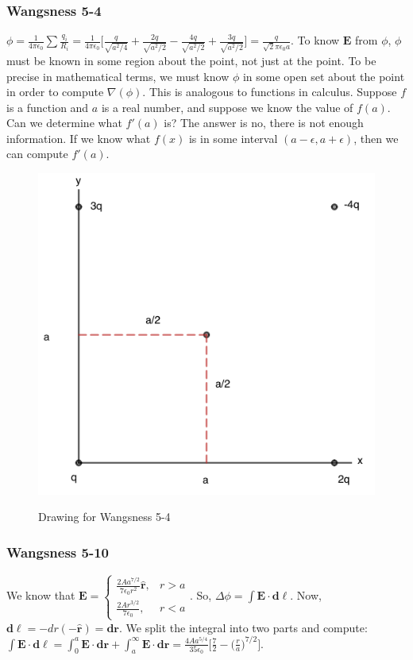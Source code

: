 \documentclass{article}
\theoremstyle{mystyle}
\begin{document}
\subsubsection{Wangsness 5-4}
$\phi = \frac{1}{4\pi \epsilon_0} \sum \frac{q_i}{R_i} = \frac{1}{4\pi \epsilon_0}\bigg[ \frac{q}{\sqrt{a^2/4}}+\frac{2q}{\sqrt{a^2/2}}-\frac{4q}{\sqrt{a^2/2}}+\frac{3q}{\sqrt{a^2/2}}\bigg] = \frac{q}{\sqrt{2}\pi \epsilon_0 a}$. To know $\mathbf{E}$ from $\phi$, $\phi$ must be known in some region about the point, not just at the point. To be precise in mathematical terms, we must know $\phi$ in some open set about the point in order to compute $\nabla(\phi)$. This is analogous to functions in calculus. Suppose $f$ is a function and $a$ is a real number, and suppose we know the value of $f(a)$. Can we determine what $f'(a)$ is? The answer is no, there is not enough information. If we know what $f(x)$ is in some interval $(a-\epsilon,a+\epsilon)$, then we can compute $f'(a)$.
\begin{figure}[htbp]
    \centering
    {\includegraphics[scale=0.4]{5-4.png}}
    \caption{Drawing for Wangsness 5-4}
\end{figure}
\subsubsection{Wangsness 5-10}
We know that $\mathbf{E} = \begin{cases} \frac{2A a^{7/2}}{7\epsilon_0 r^2}\hat{\mathbf{r}}, & r>a \\ \frac{2A r^{3/2}}{7\epsilon_0}, & r<a\end{cases}$. So, $\Delta \phi = \int \mathbf{E} \cdot \mathbf{d\ell}$. Now, $\mathbf{d\ell} = -dr(-\hat{\mathbf{r}}) = \mathbf{dr}$. We split the integral into two parts and compute: $\int \mathbf{E}\cdot \mathbf{d\ell} = \int_{0}^{a} \mathbf{E}\cdot \mathbf{dr} + \int_{a}^{\infty} \mathbf{E}\cdot \mathbf{dr} = \frac{4A a^{5/4}}{35 \epsilon_0}\bigg[ \frac{7}{2}-\big(\frac{r}{a}\big)^{7/2}\bigg]$.
\end{document}
